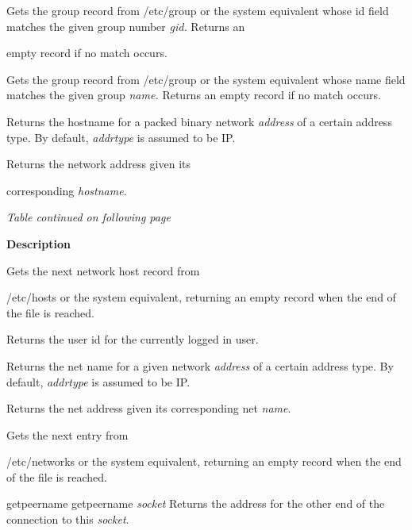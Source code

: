 \documentclass[a4paper,11pt]{book}
\begin{document}
\noindent 

\noindent Gets the group record from /etc/group or the system equivalent whose id field matches the given group number \textit{gid. }Returns an

\noindent empty record if no match occurs.

\noindent 

\noindent Gets the group record from /etc/group or the system equivalent whose name field matches the given group \textit{name. }Returns an empty record if no match occurs.

\noindent 

\noindent Returns the hostname for a packed binary network \textit{address }of a certain address type. By default, \textit{addrtype }is assumed to be IP.

\noindent 

\noindent Returns the network address given its

\noindent corresponding \textit{hostname}.

\noindent 

\noindent \textit{Table continued on following page}

\noindent 

\noindent 

\noindent \textbf{Description}

\noindent 

\noindent Gets the next network host record from

\noindent /etc/hosts or the system equivalent, returning an empty record when the end of the file is reached.

\noindent 

\noindent Returns the user id for the currently logged in user.

\noindent 

\noindent Returns the net name for a given network \textit{address }of a certain address type. By default, \textit{addrtype }is assumed to be IP.

\noindent 

\noindent Returns the net address given its corresponding net \textit{name}.

\noindent 

\noindent Gets the next entry from

\noindent /etc/networks or the system equivalent, returning an empty record when the end of the file is reached.

\noindent getpeername getpeername \textit{socket }Returns the address for the other end of the connection to this \textit{socket}.
\end{document}

